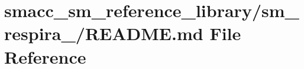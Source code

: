 \hypertarget{smacc__sm__reference__library_2sm__respira__1_2README_8md}{}\section{smacc\+\_\+sm\+\_\+reference\+\_\+library/sm\+\_\+respira\+\_/\+R\+E\+A\+D\+ME.md File Reference}
\label{smacc__sm__reference__library_2sm__respira__1_2README_8md}
